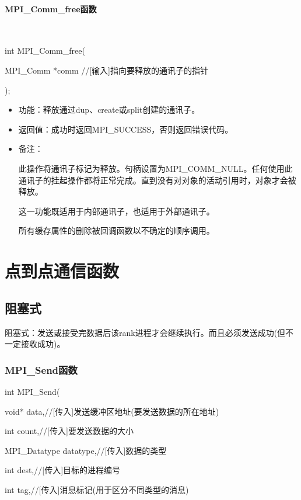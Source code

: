 \documentclass[UTF8]{article}%
\begin{document}
\paragraph{MPI\_Comm\_free函数}~{}

int MPI\_Comm\_free(
    
    \qquad MPI\_Comm *comm //[输入]指向要释放的通讯子的指针

);

\begin{itemize}
    \item 功能：释放通过dup、create或split创建的通讯子。
    \item 返回值：成功时返回MPI\_SUCCESS，否则返回错误代码。
    \item 备注：
    
    此操作将通讯子标记为释放。句柄设置为MPI\_COMM\_NULL。任何使用此通讯子的挂起操作都将正常完成。直到没有对对象的活动引用时，对象才会被释放。

    这一功能既适用于内部通讯子，也适用于外部通讯子。
    
    所有缓存属性的删除被回调函数以不确定的顺序调用。

\end{itemize}

\section{点到点通信函数}

\subsection{阻塞式}

阻塞式：发送或接受完数据后该rank进程才会继续执行。而且必须发送成功(但不一定接收成功)。

\subsubsection{MPI\_Send函数}

int MPI\_Send(

    \qquad void* data,//[传入]发送缓冲区地址(要发送数据的所在地址)

    \qquad int count,//[传入]要发送数据的大小

    \qquad MPI\_Datatype datatype,//[传入]数据的类型

    \qquad int dest,//[传入]目标的进程编号

    \qquad int tag,//[传入]消息标记(用于区分不同类型的消息)
\end{document}
